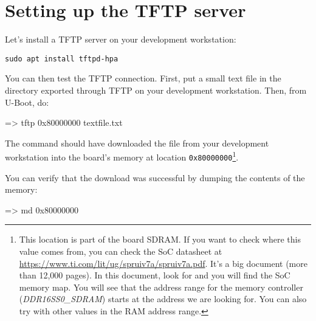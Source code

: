 \section{Setting up the TFTP server}

Let's install a TFTP server on your development workstation:

\begin{verbatim}
sudo apt install tftpd-hpa
\end{verbatim}

You can then test the TFTP connection. First, put a small text file in
the directory exported through TFTP on your development
workstation. Then, from U-Boot, do:

\begin{ubootinput}
=> tftp 0x80000000 textfile.txt
\end{ubootinput}

The  command should have downloaded the
 file from your development workstation into
the board's memory at location {\tt 0x80000000}\footnote{
This location is part of the board SDRAM. If you want
to check where this value comes from, you can check the SoC
datasheet at
\url{https://www.ti.com/lit/ug/spruiv7a/spruiv7a.pdf}.
It's a big document (more than 12,000 pages). In this document, look
for  and you will find the SoC memory map.
You will see that the address range for the memory controller
({\em DDR16SS0\_SDRAM})
starts at the address we are looking for.
You can also try with other values in the RAM address range.}.

You can verify that the download was successful by dumping the
contents of the memory:

\begin{ubootinput}
=> md 0x80000000
\end{ubootinput}


